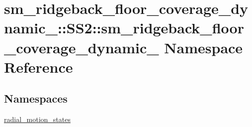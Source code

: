 \hypertarget{namespacesm__ridgeback__floor__coverage__dynamic__1_1_1SS2_1_1sm__ridgeback__floor__coverage__dynamic__1}{}\section{sm\+\_\+ridgeback\+\_\+floor\+\_\+coverage\+\_\+dynamic\+\_\+:\+:S\+S2\+:\+:sm\+\_\+ridgeback\+\_\+floor\+\_\+coverage\+\_\+dynamic\+\_ Namespace Reference}
\label{namespacesm__ridgeback__floor__coverage__dynamic__1_1_1SS2_1_1sm__ridgeback__floor__coverage__dynamic__1}
\subsection*{Namespaces}
\begin{DoxyCompactItemize}
\item 
 \hyperlink{namespacesm__ridgeback__floor__coverage__dynamic__1_1_1SS2_1_1sm__ridgeback__floor__coverage__dyde18ae0ebb476780b9af45e701a87fab}{radial\+\_\+motion\+\_\+states}
\end{DoxyCompactItemize}
